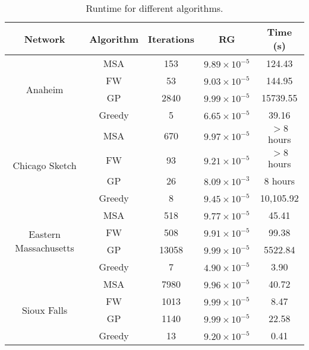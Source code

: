 \begin{table}
\caption{Runtime for different algorithms.}
\label{table:resulttable}
\center
\begin{tabular}{|c|c|c|c|c|}
\hline
Network	&	Algorithm	&	Iterations	&	RG	& Time (s)\\
\hline
\multirow{4}{*}{Anaheim}
	&	MSA	&	153	&	$9.89\times 10^{-5}$	&	124.43\\
	&	FW	&	53	&	$9.03\times 10^{-5}$	&	144.95\\
	&	GP	&	2840	&	$9.99\times 10^{-5}$	&	15739.55\\
	&	Greedy	&	5	&	$6.65\times 10^{-5}$	&	39.16\\
	\hline
\multirow{4}{*}{Chicago Sketch}
	&	MSA		&	670	&	$9.97\times 10^{-5}$	&	$>8$ hours\\
	&	FW		&	93	&	$9.21\times 10^{-5}$	&	$>8$ hours\\
	&	GP		&	26	&	$8.09\times 10^{-3}$	&	8 hours\\
	&	Greedy  &	8	&	$9.45\times 10^{-5}$	&	10,105.92\\
	\hline
\multirow{4}{*}{Eastern Massachusetts}
	&	MSA		&	518	&	$9.77\times 10^{-5}$	&	45.41\\
	&	FW		&	508	&	$9.91\times 10^{-5}$	&	99.38\\
	&	GP		&	13058	&	$9.99\times 10^{-5}$	&	5522.84\\
	&	Greedy	&	7		&	$4.90\times 10^{-5}$	&	3.90\\
	\hline
\multirow{4}{*}{Sioux Falls}
	&	MSA		&	7980	&	$9.96\times 10^{-5}$	&	40.72\\
	&	FW		&	1013	&	$9.99\times 10^{-5}$	&	8.47\\
	&	GP		&	1140	&	$9.99\times 10^{-5}$	&	22.58\\
	&	Greedy	&	13		&	$9.20\times 10^{-5}$	&	0.41\\
\hline

\end{tabular}
\end{table}
